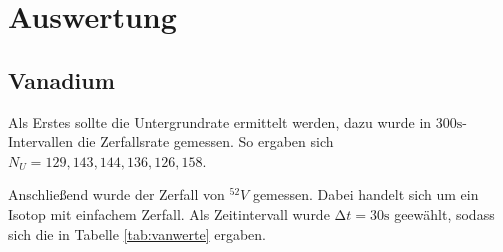 \section{Auswertung}
\label{sec:Auswertung}

\subsection{Vanadium}
Als Erstes sollte die Untergrundrate ermittelt werden, dazu wurde in 
$300 \si{\s}$-Intervallen die Zerfallsrate gemessen. So ergaben sich
$N_U = {129, 143, 144, 136, 126, 158}$.

Anschließend wurde der Zerfall von $^{52}V$ gemessen. Dabei handelt sich um 
ein Isotop mit einfachem Zerfall. Als Zeitintervall wurde $\increment t = 30 \si{\s}$
geewählt, sodass sich die in Tabelle \ref{tab:vanwerte} ergaben.

